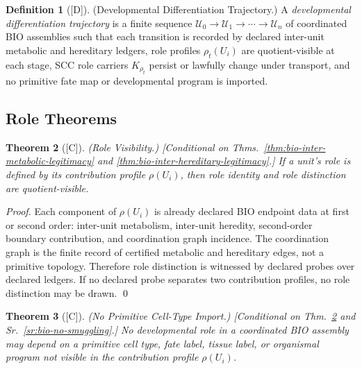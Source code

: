 \documentclass[12pt,oneside]{amsbook}
\theoremstyle{plain}
\newtheorem{theorem}{Theorem}[section]
\theoremstyle{definition}
\newtheorem{definition}[theorem]{Definition}
\theoremstyle{remark}
\newcommand{\status}[1]{\textup{[#1]}}
\begin{document}
\begin{definition}[\status{D}]\label{def:bio-dev-trajectory}
\textup{(Developmental Differentiation Trajectory.)}
A \emph{developmental differentiation trajectory} is a finite sequence
$\mathcal{U}_0 \to \mathcal{U}_1 \to \cdots \to \mathcal{U}_n$ of
coordinated BIO assemblies such that each transition is recorded by
declared inter-unit metabolic and hereditary ledgers, role profiles
$\rho_t(U_i)$ are quotient-visible at each stage, SCC role carriers
$K_{\rho_t}$ persist or lawfully change under transport, and no
primitive fate map or developmental program is imported.
\end{definition}

\subsection{Role Theorems}\label{sec:bio-DEV-theorems}

\begin{theorem}[\status{C}]\label{thm:bio-role-visibility}
\textup{(Role Visibility.)}
\textup{[Conditional on Thms.~\ref{thm:bio-inter-metabolic-legitimacy}
and \ref{thm:bio-inter-hereditary-legitimacy}.]}
If a unit's role is defined by its contribution profile
$\rho(U_i)$, then role identity and role distinction are
quotient-visible.
\end{theorem}

\begin{proof}
Each component of $\rho(U_i)$ is already declared BIO endpoint data
at first or second order: inter-unit metabolism, inter-unit heredity,
second-order boundary contribution, and coordination graph incidence.
The coordination graph is the finite record of certified metabolic
and hereditary edges, not a primitive topology. Therefore role
distinction is witnessed by declared probes over declared ledgers.
If no declared probe separates two contribution profiles, no role
distinction may be drawn.
\qed
\end{proof}

\begin{theorem}[\status{C}]\label{thm:bio-no-celltype-import}
\textup{(No Primitive Cell-Type Import.)}
\textup{[Conditional on Thm.~\ref{thm:bio-role-visibility} and
Sr.~\ref{sr:bio-no-smuggling}.]}
No developmental role in a coordinated BIO assembly may depend on
a primitive cell type, fate label, tissue label, or organismal
program not visible in the contribution profile $\rho(U_i)$.
\end{theorem}
\end{document}
